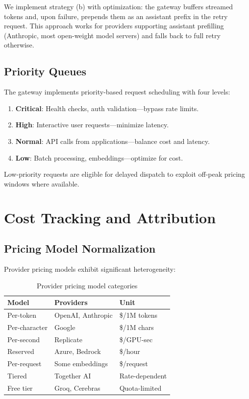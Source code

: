 \documentclass[11pt,twocolumn]{article}
\begin{document}
We implement strategy (b) with optimization: the gateway buffers streamed tokens and, upon failure, prepends them as an assistant prefix in the retry request. This approach works for providers supporting assistant prefilling (Anthropic, most open-weight model servers) and falls back to full retry otherwise.

\subsection{Priority Queues}

The gateway implements priority-based request scheduling with four levels:

\begin{enumerate}[leftmargin=*]
    \item \textbf{Critical}: Health checks, auth validation---bypass rate limits.
    \item \textbf{High}: Interactive user requests---minimize latency.
    \item \textbf{Normal}: API calls from applications---balance cost and latency.
    \item \textbf{Low}: Batch processing, embeddings---optimize for cost.
\end{enumerate}

Low-priority requests are eligible for delayed dispatch to exploit off-peak pricing windows where available.

\section{Cost Tracking and Attribution}
\label{sec:cost}

\subsection{Pricing Model Normalization}

Provider pricing models exhibit significant heterogeneity:

\begin{table}[t]
\centering
\caption{Provider pricing model categories}
\label{tab:pricing}
\begin{tabular}{@{}lll@{}}
\toprule
\textbf{Model} & \textbf{Providers} & \textbf{Unit} \\
\midrule
Per-token & OpenAI, Anthropic & \$/1M tokens \\
Per-character & Google & \$/1M chars \\
Per-second & Replicate & \$/GPU-sec \\
Reserved & Azure, Bedrock & \$/hour \\
Per-request & Some embeddings & \$/request \\
Tiered & Together AI & Rate-dependent \\
Free tier & Groq, Cerebras & Quota-limited \\
\bottomrule
\end{tabular}
\end{table}
\end{document}
